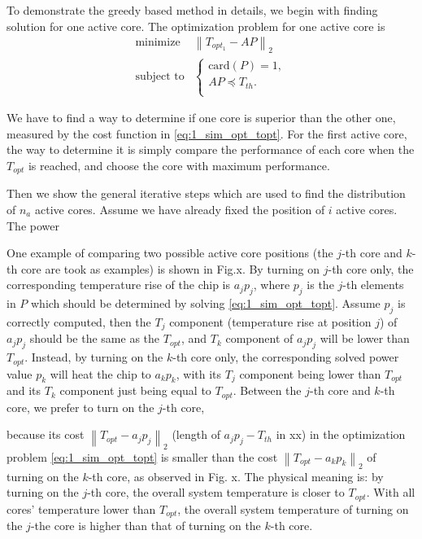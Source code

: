 To demonstrate the greedy based method in details, we begin with finding solution for one active core. The optimization problem for one active core is
\begin{equation}\label{eq:1_sim_opt_topt}
\begin{split}
\text{minimize } &  \left \| T_{opt_1} - AP \right \|_{2}\\
\text{subject to} &\left\{
\begin{array}{lr}
\text{card}(P) = 1,\\
AP \preceq T_{th}.\\
\end{array}
\right.
\end{split}
\end{equation}


We have to find a way to determine if one core is superior than the other one, measured by the cost function in \eqref{eq:1_sim_opt_topt}. For the first active core, the way to determine it is simply compare the performance of each core when the $T_{opt}$ is reached, and choose the core with maximum performance.

Then we show the general iterative steps which are used to find the distribution of $n_{a}$ active cores. Assume we have already fixed the position of $i$ active cores. The power

One example of comparing two possible active core positions (the $j$-th core and $k$-th core are took as examples) is shown in Fig.x.
By turning on $j$-th core only, the corresponding temperature rise of the chip is $a_{j}p_{j}$, where $p_{j}$ is the $j$-th elements in $P$ which should be determined by solving \eqref{eq:1_sim_opt_topt}. Assume $p_{j}$ is correctly computed, then the $T_{j}$ component (temperature rise at position $j$) of $a_{j}p_{j}$ should be the same as the $T_{opt}$, and $T_{k}$ component of $a_{j}p_{j}$ will be lower than $T_{opt}$. Instead, by turning on the $k$-th core only, the corresponding solved power value $p_{k}$ will heat the chip to $a_{k}p_{k}$, with its $T_{j}$ component being lower than $T_{opt}$ and its $T_{k}$ component just being equal to $T_{opt}$. Between the $j$-th core and $k$-th core, we prefer to turn on the $j$-th core, 


because its cost $\left \| T_{opt}-a_{j}p_{j} \right \|_{2}$ (length of $a_{j}p_{j}-T_{th}$ in xx) in the optimization problem \eqref{eq:1_sim_opt_topt} is smaller than the cost $\left \| T_{opt}-a_{k}p_{k} \right \|_{2}$ of turning on the $k$-th core, as observed in Fig. x. The physical meaning is: by turning on the $j$-th core, the overall system temperature is closer to $T_{opt}$. With all cores' temperature lower than $T_{opt}$, the overall system temperature of turning on the $j$-the core is higher than that of turning on the $k$-th core.


